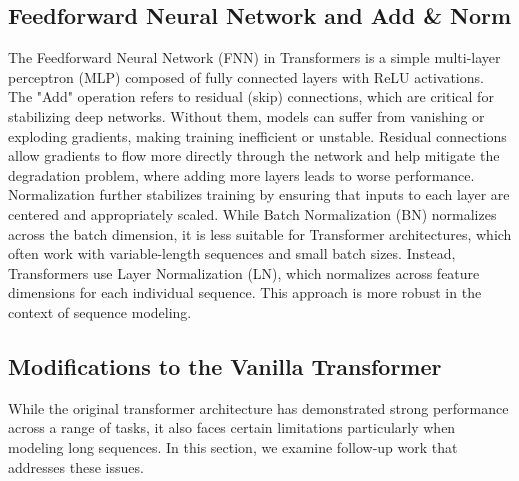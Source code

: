 \subsection{Feedforward Neural Network and Add \& Norm}
The Feedforward Neural Network (FNN) in Transformers is a simple multi-layer perceptron (MLP) composed of fully connected 
layers with ReLU activations.\newline
The "Add" operation refers to residual (skip) connections, which are critical for stabilizing deep networks. Without them, 
models can suffer from vanishing or exploding gradients, making training inefficient or unstable. Residual connections allow 
gradients to flow more directly through the network and help mitigate the degradation problem, where adding more layers leads 
to worse performance. \newline 
Normalization further stabilizes training by ensuring that inputs to each layer are centered and appropriately scaled. While 
Batch Normalization (BN) normalizes across the batch dimension, it is less suitable for Transformer architectures, which often 
work with variable-length sequences and small batch sizes. Instead, Transformers use Layer Normalization (LN), which 
normalizes across feature dimensions for each individual sequence. This approach is more robust in the context of sequence modeling.

\subsection{Modifications to the Vanilla Transformer}
While the original transformer architecture has demonstrated strong performance across a range of tasks, it also faces certain 
limitations particularly when modeling long sequences. In this section, we examine follow-up work that addresses these issues.


